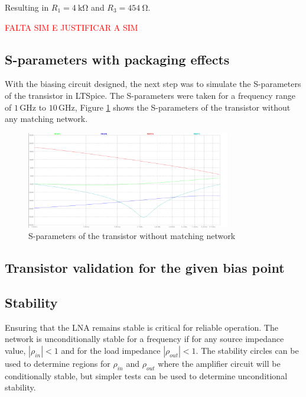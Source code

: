 Resulting in $R_1 = \SI{4}{\kilo\ohm}$ and $R_3 = \SI{454}{\ohm}$.

\textcolor{red}{FALTA SIM E JUSTIFICAR A SIM}

\subsection{S-parameters with packaging effects}

With the biasing circuit designed, the next step was to simulate the S-parameters of the transistor in LTSpice.  The S-parameters were taken for a frequency range of $1\,\si{\giga\hertz}$ to $10\,\si{\giga\hertz}$, Figure \ref{fig:withoutmathing} shows the S-parameters of the transistor without any matching network.

\begin{figure}[H]
    \centering
    \includegraphics[width=0.8\textwidth]{Images/without-matching.png}
    \caption{S-parameters of the transistor without matching network}
    \label{fig:withoutmathing}
\end{figure}

\subsection{Transistor validation for the given bias point}


\subsection{Stability}


Ensuring that the LNA remains stable is critical for reliable operation. The network is unconditionally stable for a frequency if for any source impedance value, $|\rho_{in}|<1$  and for the load impedance $|\rho_{out}|<1$.
The stability circles can be used to determine regions for $\rho_{in}$ and $\rho_{out}$ where the amplifier circuit will be conditionally stable, but simpler tests can be used to determine unconditional stability. 


